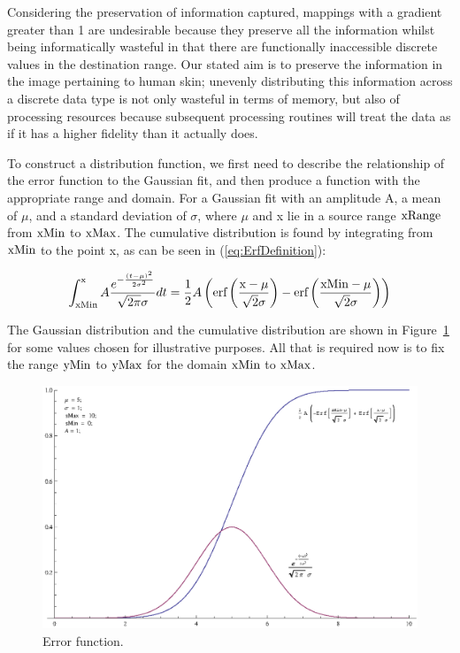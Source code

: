 Considering the preservation of information captured, mappings with a gradient greater than 1 are undesirable because they preserve all the information whilst being informatically wasteful in that there are functionally inaccessible discrete values in the destination range. Our stated aim is to preserve the information in the image pertaining to human skin; unevenly distributing this information across a discrete data type is not only wasteful in terms of memory, but also of processing resources because subsequent processing routines will treat the data as if it has a higher fidelity than it actually does.

To construct a distribution function, we first need to describe the relationship of the error function to the Gaussian fit, and then produce a function with the appropriate range and domain. For a Gaussian fit with an amplitude A, a mean of $\mu$, and a standard deviation of $\sigma$, where $\mu$ and x lie in a source range $\text{xRange}$ from $\text{xMin}$ to $\text{xMax}$. The cumulative distribution is found by integrating from $\text{xMin}$ to the point x, as can be seen in (\ref{eq:ErfDefinition}):

\begin{equation}\label{eq:ErfDefinition}
  \int _{\text{xMin}}^{\text{x}} A \frac{e^{-\frac{(t-\mu )^2}{2 \sigma ^2}}}{\sqrt{2 \pi } \sigma }dt=\frac{1}{2} A \left(\text{erf}\left(\frac{\text{x}-\mu }{\sqrt{2} \sigma }\right)-\text{erf}\left(\frac{\text{xMin}-\mu }{\sqrt{2} \sigma }\right)\right)
\end{equation}

The Gaussian distribution and the cumulative distribution are shown in Figure~\ref{fig:ErrorFunctionGraph} for some values chosen for illustrative purposes. All that is required now is to fix the range $\text{yMin}$ to $\text{yMax}$ for the domain $\text{xMin}$ to $\text{xMax}$.

\begin{figure}[h!]
  \caption{Error function.}  \label{fig:ErrorFunctionGraph}
  \centering
    \includegraphics[width=\textwidth]{Chapter2/Figs/errorFunction.eps}
\end{figure}

